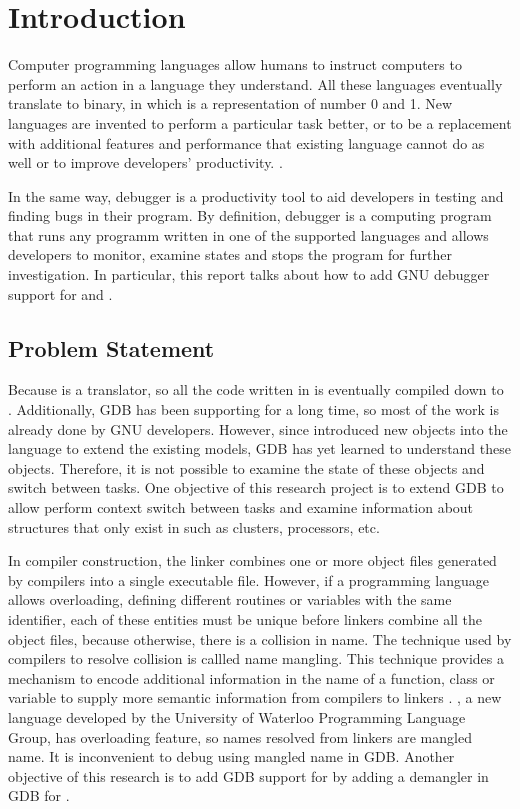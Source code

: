 \chapter{Introduction} \label{introduction}

Computer programming languages allow humans to instruct computers to perform an
action in a language they understand. All these languages eventually translate
to binary, in which is a representation of number 0 and 1. New languages are
invented to perform a particular task better, or to be a replacement with
additional features and performance that existing language cannot do as well or
to improve developers' productivity.
\cite{Reference1}.

In the same way, debugger is a productivity tool to aid developers in testing
and finding bugs in their program. By definition, debugger is a computing program that runs
any programm written in one of the supported languages and allows developers to
monitor, examine states and stops the program for further investigation. In
particular, this report talks about how to add GNU debugger support for \uCPPS
and \CFA.

\section{Problem Statement}
Because \uCPPS is a translator, so all the code written in \uCPPS is eventually
compiled down to \CC. Additionally, GDB has been supporting \CCS for a long time,
so most of the work is already done by GNU developers. However, since \uCPPS introduced
new objects into the language to extend the existing models, GDB has yet learned
to understand these objects. Therefore, it is not possible to examine the state
of these objects and switch between tasks. One objective of this research
project is to extend GDB to allow perform context switch
between tasks and examine information about structures that only exist in \uCPPS
such as clusters, processors, etc.

In compiler construction, the linker combines one or more object files generated
by compilers into a single executable file. However, if a programming
language allows overloading, defining different routines or variables with the
same identifier, each of these entities must be unique before linkers
combine all the object files, because otherwise, there is a collision in name.
The technique used by compilers to resolve collision is callled name mangling.
This technique provides a mechanism to encode additional information in the
name of a function, class or variable to supply more semantic information from
compilers to linkers \cite{reference9}. \CFAS, a new language developed by the University of
Waterloo Programming Language Group, has overloading feature, so names resolved from
linkers are mangled name. It is inconvenient to debug using mangled name in
GDB. Another objective of this research is to add GDB support for \CFA by
adding a demangler in GDB for \CFAS.
